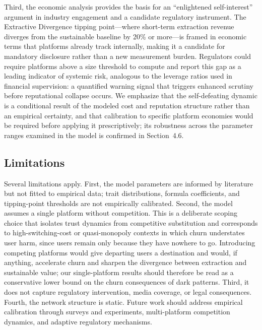 \documentclass[a4paper,fleqn]{cas-sc}
\begin{document}
Third, the economic analysis provides the basis for an ``enlightened self-interest'' argument in industry engagement and a candidate regulatory instrument. The Extractive Divergence tipping point---where short-term extraction revenue diverges from the sustainable baseline by 20\% or more---is framed in economic terms that platforms already track internally, making it a candidate for mandatory disclosure rather than a new measurement burden. Regulators could require platforms above a size threshold to compute and report this gap as a leading indicator of systemic risk, analogous to the leverage ratios used in financial supervision: a quantified warning signal that triggers enhanced scrutiny before reputational collapse occurs. We emphasize that the self-defeating dynamic is a conditional result of the modeled cost and reputation structure rather than an empirical certainty, and that calibration to specific platform economies would be required before applying it prescriptively; its robustness across the parameter ranges examined in the model is confirmed in Section~4.6.

\subsection{Limitations}
Several limitations apply. First, the model parameters are informed by literature but not fitted to empirical data; trait distributions, formula coefficients, and tipping-point thresholds are not empirically calibrated. Second, the model assumes a single platform without competition. This is a deliberate scoping choice that isolates trust dynamics from competitive substitution and corresponds to high-switching-cost or quasi-monopoly contexts in which churn understates user harm, since users remain only because they have nowhere to go. Introducing competing platforms would give departing users a destination and would, if anything, accelerate churn and sharpen the divergence between extraction and sustainable value; our single-platform results should therefore be read as a conservative lower bound on the churn consequences of dark patterns. Third, it does not capture regulatory intervention, media coverage, or legal consequences. Fourth, the network structure is static. Future work should address empirical calibration through surveys and experiments, multi-platform competition dynamics, and adaptive regulatory mechanisms.

\end{document}
